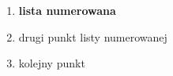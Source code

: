 \begin{flushleft}
       \begin{enumerate}
        \item \textbf{lista numerowana} 
        \item drugi punkt listy numerowanej
        \item kolejny punkt 
    \end{enumerate}
       
  
 
   
\end{flushleft}